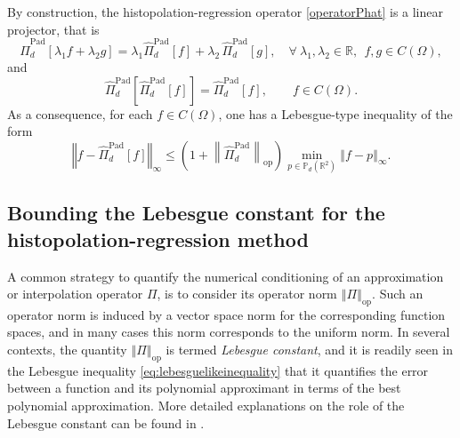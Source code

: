 \documentclass{svjour3}
\newcommand{\R}{\mathbb{R}} %
\renewcommand{\P}{\mathbb{P}} %
\begin{document}
\begin{remark}
    By construction, the histopolation-regression operator \eqref{operatorPhat} is a linear projector, that is
    $$ \hat{\Pi}_d^{\mathrm{Pad}} \left[\lambda_1 f + \lambda_2 g\right] = \lambda_1 \hat{\Pi}_d^{\mathrm{Pad}}[f] + \lambda_2 \, \hat{\Pi}_d^{\mathrm{Pad}}[g], \quad \forall \ \lambda_1,  \lambda_2 \in \R, \ \ f,g \in C(\Omega), $$
    and 
    \begin{equation}\label{cind2}
     \hat{\Pi}^{\mathrm{Pad}}_{d}\left[\hat{\Pi}^{\mathrm{Pad}}_{d} [f]\right]=\hat{\Pi}^{\mathrm{Pad}}_{d} [f], \qquad f \in C(\Omega).
    \end{equation}
As a consequence, for each $ f \in C (\Omega) $, one has a Lebesgue-type inequality of the form
\begin{equation} \label{eq:lebesguelikeinequality}
	 \left\Vert f -  \hat{\Pi}_d^{\mathrm{Pad}}[f] \right\Vert_\infty \leq \left( 1 + \left\lVert \hat{\Pi}_d^{\mathrm{Pad}} \right\rVert_{\mathrm{op}} \right) \min_{p \in \P_d\left(\mathbb{R}^2\right)} \left\Vert f - p \right\Vert_\infty .
\end{equation}
\end{remark}

\subsection{Bounding the Lebesgue constant for the histopolation-regression method}

A common strategy to quantify the numerical conditioning of an approximation or interpolation operator $ \Pi $, is to consider its operator norm $ \left\Vert \Pi \right\Vert_{\mathrm{op}} $. Such an operator norm is induced by a vector space norm for the corresponding function spaces, and in many cases this norm corresponds to the uniform norm. In several contexts, the quantity $ \left\Vert \Pi \right\Vert_{\mathrm{op}} $ is termed \emph{Lebesgue constant}, and it is readily seen in the Lebesgue inequality \eqref{eq:lebesguelikeinequality} that it quantifies the error between a function and its polynomial approximant in terms of the best polynomial approximation. More detailed explanations on the role of the Lebesgue constant can be found in \cite[Chapter 2]{Davis:1975:IAA}.
\end{document}
